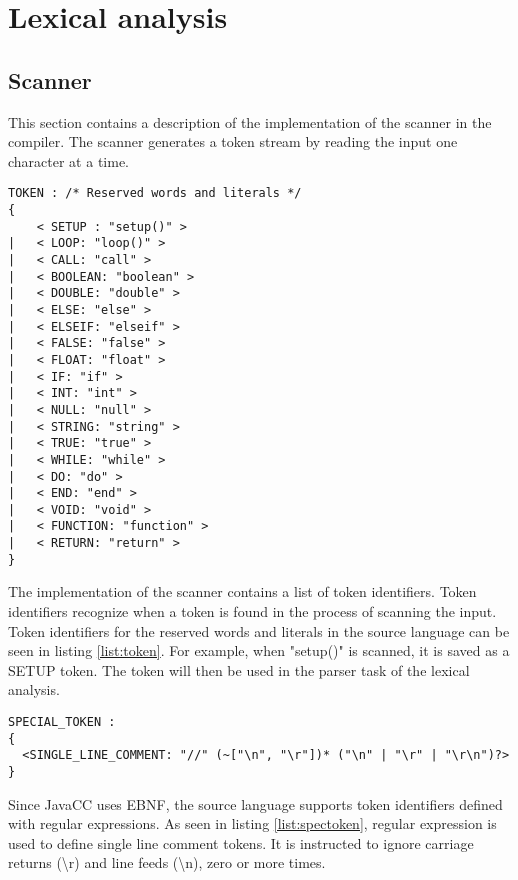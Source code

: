 \section{Lexical analysis}
\subsection{Scanner}
This section contains a description of the implementation of the scanner in the compiler. The scanner generates a token stream by reading the input one character at a time.


\begin{lstlisting}[caption=Token identifiers for reserved words and literals, label=list:token]
TOKEN : /* Reserved words and literals */
{
	< SETUP : "setup()" >
|	< LOOP: "loop()" >	
|	< CALL: "call" >
|	< BOOLEAN: "boolean" >
|	< DOUBLE: "double" >
|	< ELSE: "else" >
|	< ELSEIF: "elseif" >
|	< FALSE: "false" >
|	< FLOAT: "float" >
|	< IF: "if" >
|	< INT: "int" >
|	< NULL: "null" >
|	< STRING: "string" >
|	< TRUE: "true" >
|	< WHILE: "while" >
| 	< DO: "do" >
| 	< END: "end" >
|   < VOID: "void" >
|   < FUNCTION: "function" >
|   < RETURN: "return" >
}

\end{lstlisting}

The implementation of the scanner contains a list of token identifiers. Token identifiers recognize when a token is found in the process of scanning the input. Token identifiers for the reserved words and literals in the source language can be seen in listing \ref{list:token}. For example, when "setup()" is scanned, it is saved as a SETUP token. The token will then be used in the parser task of the lexical analysis. 


\begin{lstlisting}[caption=Special token for single line comment, label=list:spectoken]
SPECIAL_TOKEN :
{
  <SINGLE_LINE_COMMENT: "//" (~["\n", "\r"])* ("\n" | "\r" | "\r\n")?>
}
\end{lstlisting}

Since JavaCC uses EBNF, the source language supports token identifiers defined with regular expressions. As seen in listing \ref{list:spectoken}, regular expression is used to define single line comment tokens. It is instructed to ignore carriage returns (\textbackslash{r}) and line feeds (\textbackslash{n}), zero or more times. 

 
